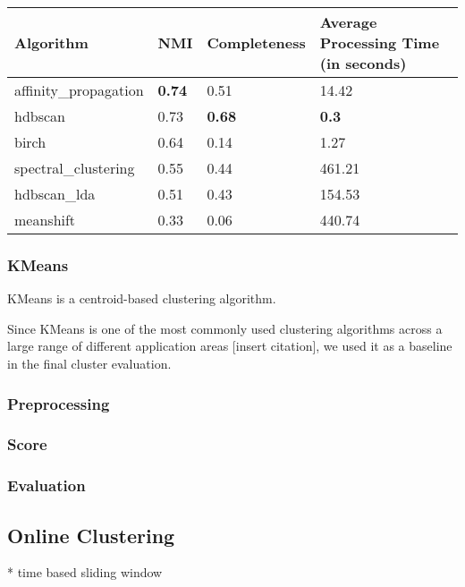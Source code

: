 \begin{table}[h]
    \centering
    \caption{}
    \label{undefined}
    \begin{tabular}{|l|l|l|l|}
    \hline
    \textbf{Algorithm} & \textbf{NMI} & \textbf{Completeness}  & \textbf{Average Processing Time (in seconds)} \\ \hline
    affinity\_propagation & \textbf{0.74} & 0.51 & 14.42 \\ \hline
    hdbscan & 0.73 & \textbf{0.68} & \textbf{0.3} \\ \hline
    birch & 0.64 & 0.14 & 1.27 \\ \hline
    spectral\_clustering & 0.55 & 0.44  & 461.21 \\ \hline
    hdbscan\_lda & 0.51 & 0.43 & 154.53 \\ \hline
    meanshift & 0.33 & 0.06  & 440.74 \\ \hline
    \end{tabular}
\end{table}

\subsubsection{KMeans}

KMeans is a centroid-based clustering algorithm. 


Since KMeans is one of the most commonly used clustering algorithms across a large range of different application areas [insert citation], we used it as a baseline in the final cluster evaluation.

\subsubsection{Preprocessing}


\subsubsection{Score}

\subsubsection{Evaluation}




\subsection{Online Clustering}

* time based sliding window

